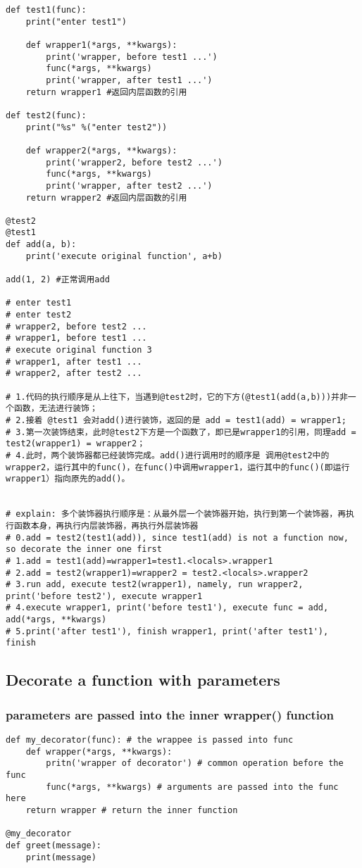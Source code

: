 \documentclass[11pt]{article}
\begin{document}
\begin{verbatim}
def test1(func):
    print("enter test1")

    def wrapper1(*args, **kwargs):
        print('wrapper, before test1 ...')
        func(*args, **kwargs)
        print('wrapper, after test1 ...')
    return wrapper1 #返回内层函数的引用

def test2(func):
    print("%s" %("enter test2"))

    def wrapper2(*args, **kwargs):
        print('wrapper2, before test2 ...')
        func(*args, **kwargs)
        print('wrapper, after test2 ...')
    return wrapper2 #返回内层函数的引用

@test2
@test1
def add(a, b):
    print('execute original function', a+b)

add(1, 2) #正常调用add

# enter test1
# enter test2
# wrapper2, before test2 ...
# wrapper1, before test1 ...
# execute original function 3
# wrapper1, after test1 ...
# wrapper2, after test2 ...

# 1.代码的执行顺序是从上往下，当遇到@test2时，它的下方(@test1(add(a,b)))并非一个函数，无法进行装饰；
# 2.接着 @test1 会对add()进行装饰，返回的是 add = test1(add) = wrapper1;
# 3.第一次装饰结束，此时@test2下方是一个函数了，即已是wrapper1的引用，同理add = test2(wrapper1) = wrapper2；
# 4.此时，两个装饰器都已经装饰完成。add()进行调用时的顺序是 调用@test2中的wrapper2，运行其中的func()，在func()中调用wrapper1，运行其中的func()(即运行wrapper1）指向原先的add()。


# explain: 多个装饰器执行顺序是：从最外层一个装饰器开始，执行到第一个装饰器，再执行函数本身，再执行内层装饰器，再执行外层装饰器
# 0.add = test2(test1(add)), since test1(add) is not a function now, so decorate the inner one first
# 1.add = test1(add)=wrapper1=test1.<locals>.wrapper1
# 2.add = test2(wrapper1)=wrapper2 = test2.<locals>.wrapper2
# 3.run add, execute test2(wrapper1), namely, run wrapper2, print('before test2'), execute wrapper1
# 4.execute wrapper1, print('before test1'), execute func = add, add(*args, **kwargs)
# 5.print('after test1'), finish wrapper1, print('after test1'), finish
\end{verbatim}
\subsection{Decorate a function with parameters}
\label{sec:orgb53e4d7}
\subsubsection{parameters are passed into the inner wrapper() function}
\label{sec:org4e940da}
\begin{verbatim}
def my_decorator(func): # the wrappee is passed into func
    def wrapper(*args, **kwargs):
        pritn('wrapper of decorator') # common operation before the func
        func(*args, **kwargs) # arguments are passed into the func here
    return wrapper # return the inner function

@my_decorator
def greet(message):
    print(message)
\end{verbatim}
\end{document}

